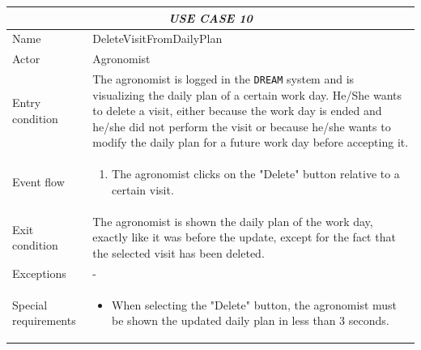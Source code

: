 \documentclass{article}
\begin{document}
\centering
\begin{longtable}{|p{3.5cm}|m{8cm}|}
 \hline
 \multicolumn{2}{|c|}{\cellcolor{white}\emph{USE CASE 10}} \\
 \endfirsthead
 \endhead
 \endfoot
 \endlastfoot
 \hline
 Name & DeleteVisitFromDailyPlan\\
 \hline
 Actor & Agronomist\\
 \hline
 Entry condition & The agronomist is logged in the \verb|DREAM| system and is visualizing the daily plan of a certain work day. He/She wants to delete a visit, either because the work day is ended and he/she did not perform the visit or because he/she wants to modify the daily plan for a future work day before accepting it.\\
 \hline
 Event flow & \begin{enumerate}
    \item The agronomist clicks on the "Delete" button relative to a certain visit.
 \end{enumerate}\\
 \hline
 Exit condition & The agronomist is shown the daily plan of the work day, exactly like it was before the update, except for the fact that the selected visit has been deleted.\\
 \hline
 Exceptions & - \\
 \hline
 Special requirements &\begin{itemize}
     \item When selecting the "Delete" button, the agronomist must be shown the updated daily plan in less than 3 seconds.
 \end{itemize}\\
 \hline
\end{longtable}
\end{document}
